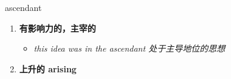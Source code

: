 
\begin{frame}
{\huge ascendant}
\begin{center}
\begin{enumerate}\Large
  \item \textbf{有影响力的，主宰的}
  \begin{itemize}
    \item \em{\Large{this idea was in the ascendant 处于主导地位的思想}}
  \end{itemize}
  \item \textbf{上升的 arising}
\end{enumerate}
\end{center}
\end{frame}
